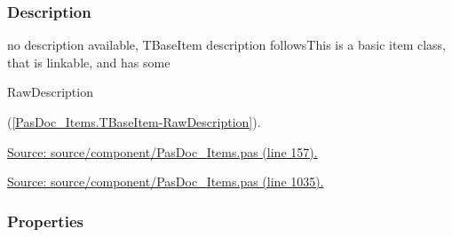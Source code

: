 \documentclass{report}
\begin{document}
\subsubsection*{\large{\textbf{Description}}\normalsize\hspace{1ex}\hfill}
no description available, TBaseItem description followsThis is a basic item class, that is linkable, and has some \begin{ttfamily}RawDescription\end{ttfamily}(\ref{PasDoc_Items.TBaseItem-RawDescription}).\par
\href{https://github.com/pasdoc/pasdoc/blob/master/source/component/PasDoc_Items.pas#L157}{Source: source/component/PasDoc{\_}Items.pas (line 157).}\par
\href{https://github.com/pasdoc/pasdoc/blob/master/source/component/PasDoc_Items.pas#L1035}{Source: source/component/PasDoc{\_}Items.pas (line 1035).}\subsubsection*{\large{\textbf{Properties}}\normalsize\hspace{1ex}\hfill}
\end{document}
